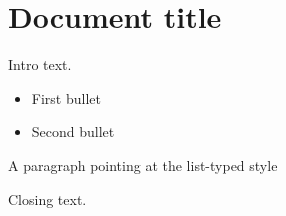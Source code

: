 \documentclass[11pt,a4paper]{article}
\begin{document}
\section{Document title}

Intro text.

\begin{itemize}
\item First bullet
\item Second bullet
\end{itemize}

A paragraph pointing at the list-typed style

Closing text.
\end{document}
